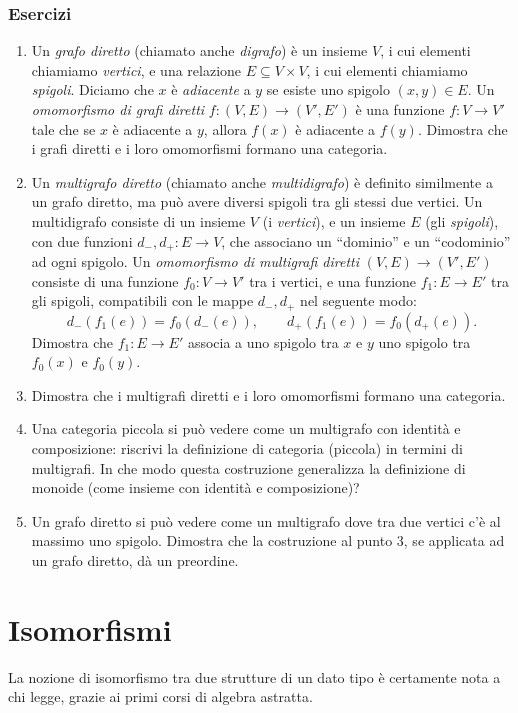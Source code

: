 \subsubsection*{Esercizi}
\begin{enumerate}
	\item Un \emph{grafo diretto} (chiamato anche \emph{digrafo}) è un insieme \(V\), i cui elementi chiamiamo \emph{vertici}, e una relazione \(E\subseteq V\times V\), i cui elementi chiamiamo \emph{spigoli}. Diciamo che \(x\) è \emph{adiacente} a \(y\) se esiste uno spigolo \((x,y)\in E\). Un \emph{omomorfismo di grafi diretti} \(f:(V,E)\to (V',E')\) è una funzione \(f:V\to V'\) tale che se \(x\) è adiacente a \(y\), allora \(f(x)\) è adiacente a \(f(y)\). Dimostra che i grafi diretti e i loro omomorfismi formano una categoria.
	\item Un \emph{multigrafo diretto} (chiamato anche \emph{multidigrafo}) è definito similmente a un grafo diretto, ma può avere diversi spigoli tra gli stessi due vertici. Un multidigrafo consiste di un insieme \(V\) (i \emph{vertici}), e un insieme \(E\) (gli \emph{spigoli}), con due funzioni \(d_-,d_+:E\to V\), che associano un ``dominio'' e un ``codominio'' ad ogni spigolo. Un \emph{omomorfismo di multigrafi diretti} \((V,E)\to (V',E')\) consiste di una funzione \(f_0:V\to V'\) tra i vertici, e una funzione \(f_1:E\to E'\) tra gli spigoli, compatibili con le mappe \(d_-,d_+\) nel seguente modo:
	      \[
		      d_-(f_1(e)) = f_0(d_-(e)) ,\qquad d_+(f_1(e)) = f_0(d_+(e)) .
	      \]
	      Dimostra che \(f_1:E\to E'\) associa a uno spigolo tra \(x\) e \(y\) uno spigolo tra \(f_0(x)\) e \(f_0(y)\).
	\item Dimostra che i multigrafi diretti e i loro omomorfismi formano una categoria.
	\item Una categoria piccola si può vedere come un multigrafo con identità e composizione: riscrivi la definizione di categoria (piccola) in termini di multigrafi.  In che modo questa costruzione generalizza la definizione di monoide (come insieme con identità e composizione)?
	\item Un grafo diretto si può vedere come un multigrafo dove tra due vertici c'è al massimo uno spigolo. Dimostra che la costruzione al punto 3, se applicata ad un grafo diretto, dà un preordine.
\end{enumerate}
\color{black}
\section{Isomorfismi}\label{isomorfismi}
La nozione di isomorfismo tra due strutture di un dato tipo è certamente nota a chi legge, grazie ai primi corsi di algebra astratta.

